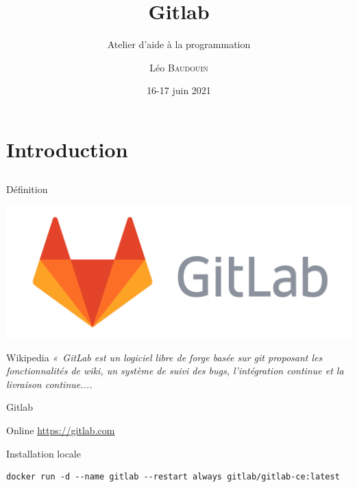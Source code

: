 \documentclass{beamer}
\title{Gitlab}
\subtitle{Atelier d'aide à la programmation}
\author{L\'eo \textsc{Baudouin}}
\institute{
  {\url{baudouin.leo @ gmail.com}}
}
\date{16-17 juin 2021}
\begin{document}
\begin{frame}
  \titlepage
\end{frame}

\section{Introduction}
\subsection{}

\begin{frame}{Définition}


\begin{center}
\includegraphics[width=0.5\linewidth]{images/gitlab-logo}
\end{center}

\begin{block}{Wikipedia}
{\it 
«~GitLab est un logiciel libre de forge basée sur git proposant les fonctionnalités de wiki, un système de suivi des bugs, l’intégration continue et la livraison continue....}
\end{block}
\end{frame}



\begin{frame}[fragile]{Gitlab}

\begin{block}{Online}
\href{https://gitlab.com}{https://gitlab.com}
\end{block}

\begin{block}{Installation locale}
\scriptsize
\begin{verbatim}
docker run -d --name gitlab --restart always gitlab/gitlab-ce:latest
\end{verbatim}
\end{block}


\end{frame}
\end{document}
